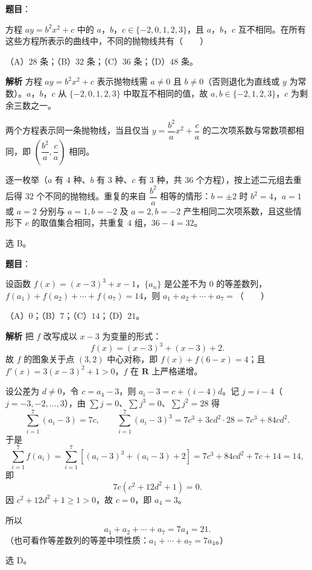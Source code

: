 \begin{answer}

\textbf{题目}：

方程 $ay=b^2x^2+c$ 中的 $a$，$b$，$c\in\{-2,0,1,2,3\}$，且 $a$，$b$，$c$ 互不相同。在所有这些方程所表示的曲线中，不同的抛物线共有\mbox{（　　）}

（A）$28$ 条；（B）$32$ 条；（C）$36$ 条；（D）$48$ 条。

\textbf{解析}
方程 $ay=b^2x^2+c$ 表示抛物线需 $a\neq0$ 且 $b\neq0$（否则退化为直线或 $y$ 为常数）。$a$，$b$，$c$ 从 $\{-2,0,1,2,3\}$ 中取互不相同的值，故 $a,b\in\{-2,1,2,3\}$，$c$ 为剩余三数之一。

两个方程表示同一条抛物线，当且仅当 $y=\dfrac{b^2}ax^2+\dfrac ca$ 的二次项系数与常数项都相同，即 $\left(\dfrac{b^2}a,\dfrac ca\right)$ 相同。

逐一枚举（$a$ 有 $4$ 种、$b$ 有 $3$ 种、$c$ 有 $3$ 种，共 $36$ 个方程），按上述二元组去重后得 $32$ 个不同的抛物线。重复的来自 $\dfrac{b^2}a$ 相等的情形：$b=\pm2$ 时 $b^2=4$，$a=1$ 或 $a=2$ 分别与 $a=1,b=-2$ 及 $a=2,b=-2$ 产生相同二次项系数，且这些情形下 $c$ 的取值集合相同，共重复 $4$ 组，$36-4=32$。

选 B。


\end{answer}
\begin{answer}

\textbf{题目}：

设函数 $f(x)=(x-3)^3+x-1$，$\{a_n\}$ 是公差不为 $0$ 的等差数列，$f(a_1)+f(a_2)+\cdots+f(a_7)=14$，则 $a_1+a_2+\cdots+a_7=$\mbox{（　　）}

（A）$0$；（B）$7$；（C）$14$；（D）$21$。

\textbf{解析}
把 $f$ 改写成以 $x-3$ 为变量的形式：
\nopagebreak[4]
\[f(x)=(x-3)^3+(x-3)+2.\]
故 $f$ 的图象关于点 $(3,2)$ 中心对称，即 $f(x)+f(6-x)=4$；且 $f'(x)=3(x-3)^2+1>0$，$f$ 在 $\mathbf R$ 上严格递增。

设公差为 $d\neq0$，令 $c=a_4-3$，则 $a_i-3=c+(i-4)d$。记 $j=i-4$（$j=-3,-2,\dots,3$），由 $\sum j=0$、$\sum j^3=0$、$\sum j^2=28$ 得
\nopagebreak[4]
\[\sum_{i=1}^7\left(a_i-3\right)=7c,\qquad \sum_{i=1}^7\left(a_i-3\right)^3=7c^3+3cd^2\cdot28=7c^3+84cd^2.\]
于是
\nopagebreak[4]
\[\sum_{i=1}^7f(a_i)=\sum_{i=1}^7\left[\left(a_i-3\right)^3+\left(a_i-3\right)+2\right]=7c^3+84cd^2+7c+14=14,\]
即
\nopagebreak[4]
\[7c\left(c^2+12d^2+1\right)=0.\]
因 $c^2+12d^2+1\geqslant1>0$，故 $c=0$，即 $a_4=3$。

所以
\nopagebreak[4]
\[a_1+a_2+\cdots+a_7=7a_4=21.\]
（也可看作等差数列的等差中项性质：$a_1+\cdots+a_7=7a_4$。）

选 D。


\end{answer}
